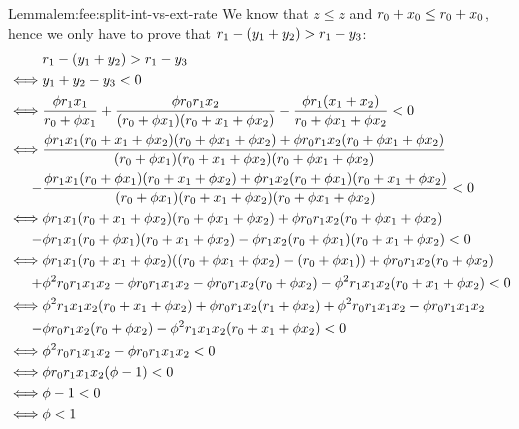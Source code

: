 \begin{proofof}{Lemma}{lem:fee:split-int-vs-ext-rate}
    We know that $z \leq z$ and $\ammR[0] + x_0 \leq \ammR[0] + x_0$, hence we only have to prove that $\ammR[1] - (y_1 + y_2) > \ammR[1] - y_3$:
    \begin{align*}
        & \ammR[1] - (y_1 + y_2) > \ammR[1] - y_3
        \\
        \iff & y_1 + y_2 - y_3 < 0
        \\
        \iff & \frac{\fee \ammR[1] x_1}{\ammR[0] + \fee x_1} + \frac{\fee \ammR[0] \ammR[1] x_2}{(\ammR[0] + \fee x_1)(\ammR[0] + x_1 + \fee x_2)}
        - \frac{\fee \ammR[1] (x_1 + x_2)}{\ammR[0] + \fee x_1 + \fee x_2} < 0
        \\
        \iff & \frac
            {\fee \ammR[1] x_1 (\ammR[0] + x_1 + \fee x_2)(\ammR[0] + \fee x_1 + \fee x_2) + \fee \ammR[0] \ammR[1] x_2 (\ammR[0] + \fee x_1 + \fee x_2)}
            {(\ammR[0] + \fee x_1)(\ammR[0] + x_1 + \fee x_2)(\ammR[0] + \fee x_1 + \fee x_2)}
            \\
            - & \frac{\fee \ammR[1] x_1 (\ammR[0] + \fee x_1)(\ammR[0] + x_1 + \fee x_2) + \fee \ammR[1] x_2 (\ammR[0] + \fee x_1)(\ammR[0] + x_1 + \fee x_2)}
            {(\ammR[0] + \fee x_1)(\ammR[0] + x_1 + \fee x_2)(\ammR[0] + \fee x_1 + \fee x_2)} < 0
        \\
        \iff & 
            \fee \ammR[1] x_1 (\ammR[0] + x_1 + \fee x_2)(\ammR[0] + \fee x_1 + \fee x_2) + \fee \ammR[0] \ammR[1] x_2 (\ammR[0] + \fee x_1 + \fee x_2) 
            \\
            - & \fee \ammR[1] x_1 (\ammR[0] + \fee x_1)(\ammR[0] + x_1 + \fee x_2) - \fee \ammR[1] x_2 (\ammR[0] + \fee x_1)(\ammR[0] + x_1 + \fee x_2) < 0
        \\
        \iff & 
            \fee \ammR[1] x_1 (\ammR[0] + x_1 + \fee x_2)((\ammR[0] + \fee x_1 + \fee x_2) - (\ammR[0] + \fee x_1)) + \fee \ammR[0] \ammR[1] x_2 (\ammR[0] + \fee x_2)
            \\
            + & \fee^2 \ammR[0] \ammR[1] x_1 x_2 - \fee \ammR[0] \ammR[1] x_1 x_2 - \fee \ammR[0] \ammR[1] x_2 (\ammR[0] + \fee x_2) - \fee^2 \ammR[1] x_1 x_2 (\ammR[0] + x_1 + \fee x_2) < 0
        \\
        \iff & 
            \fee^2 \ammR[1] x_1 x_2 (\ammR[0] + x_1 + \fee x_2) + \fee \ammR[0] \ammR[1] x_2 (\ammR[1] + \fee x_2) + \fee^2 \ammR[0] \ammR[1] x_1 x_2 - \fee \ammR[0] \ammR[1] x_1 x_2
            \\
            - & \fee \ammR[0] \ammR[1] x_2 (\ammR[0] + \fee x_2) - \fee^2 \ammR[1] x_1 x_2 (\ammR[0] + x_1 + \fee x_2) < 0
        \\
        \iff & 
            \fee^2 \ammR[0] \ammR[1] x_1 x_2 - \fee \ammR[0] \ammR[1] x_1 x_2 < 0
        \\
        \iff & 
            \fee \ammR[0] \ammR[1] x_1 x_2 (\fee - 1) < 0
        \\
        \iff &
            \fee - 1 < 0 
        \\
        \iff & \fee < 1
    \end{align*}
\end{proofof}

